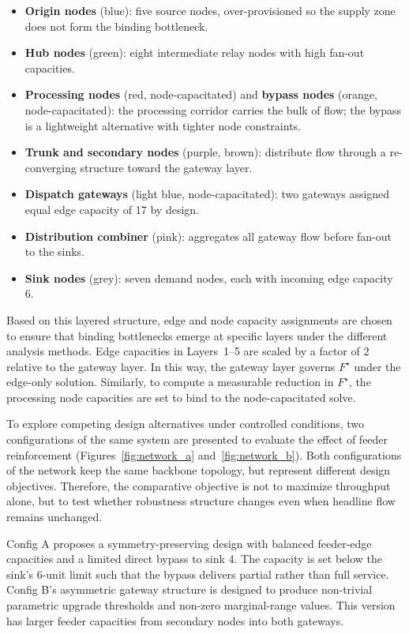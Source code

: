 \documentclass[12pt]{report}
\begin{document}
\begin{itemize}
    \item \textbf{Origin nodes} (blue): five source nodes, over-provisioned so the supply zone does not form the binding bottleneck.
    \item \textbf{Hub nodes} (green): eight intermediate relay nodes with high fan-out capacities.
    \item \textbf{Processing nodes} (red, node-capacitated) and \textbf{bypass nodes} (orange, node-capacitated): the processing corridor carries the bulk of flow; the bypass is a lightweight alternative with tighter node constraints.
    \item \textbf{Trunk and secondary nodes} (purple, brown): distribute flow through a re-converging structure toward the gateway layer.
    \item \textbf{Dispatch gateways} (light blue, node-capacitated): two gateways assigned equal edge capacity of 17 by design.
    \item \textbf{Distribution combiner} (pink): aggregates all gateway flow before fan-out to the sinks.
    \item \textbf{Sink nodes} (grey): seven demand nodes, each with incoming edge capacity 6.
\end{itemize}
Based on this layered structure, edge and node capacity assignments are chosen to ensure that binding bottlenecks emerge at specific layers under the different analysis methods. Edge capacities in Layers~1--5 are scaled by a factor of 2 relative to the gateway layer. In this way, the gateway layer governs $F^\star$ under the edge-only solution. Similarly, to compute a measurable reduction in $F^\star$, the processing node capacities are set to bind to the node-capacitated solve.

To explore competing design alternatives under controlled conditions, two configurations of the same system are presented to evaluate the effect of feeder reinforcement (Figures~\ref{fig:network_a} and~\ref{fig:network_b}). 
Both configurations of the network keep the same backbone topology, but represent different design objectives. Therefore, the comparative objective is not to maximize throughput alone, but to test whether robustness structure changes even when headline flow remains unchanged. 

Config A proposes a symmetry-preserving design with balanced feeder-edge capacities and a limited direct bypass to sink 4. The capacity is set below the sink's 6-unit limit such that the bypass delivers partial rather than full service. Config B's asymmetric gateway structure is designed to produce non-trivial parametric upgrade thresholds and non-zero marginal-range values. This version has larger feeder capacities from secondary nodes into both gateways.
 
\end{document}

